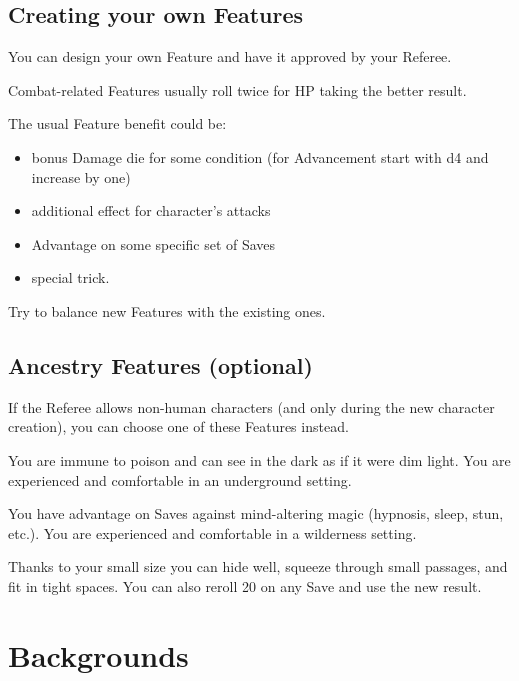 \documentclass[itdr]{subfiles}
\begin{document}
\begin{dbox}
\subsection*{Creating your own Features}

You can design your own Feature and have it approved by your Referee.

Combat-related Features usually roll twice for HP taking the better result.

The usual Feature benefit could be:
\begin{itemize}
	\item bonus Damage die for some condition (for Advancement start with d4 and increase by one)
	\item additional effect for character's attacks
	\item Advantage on some specific set of Saves
	\item special trick.
\end{itemize}

Try to balance new Features with the existing ones.
\end{dbox}

\vfill
\subsection*{Ancestry Features (optional)}

If the Referee allows non-human characters (and only during the new character creation), you can choose one of these Features instead.

\vfill
{}
You are immune to poison and can see in the dark as if it were dim light. You are experienced and comfortable in an underground setting.

\vfill
{}
You have advantage on Saves against mind-altering magic (hypnosis, sleep, stun, etc.). You are experienced and comfortable in a wilderness setting.

\vfill
{}
Thanks to your small size you can hide well, squeeze through small passages, and fit in tight spaces. You can also reroll 20 on any Save and use the new result.

\vfill
\break


\section{Backgrounds}
\end{document}
